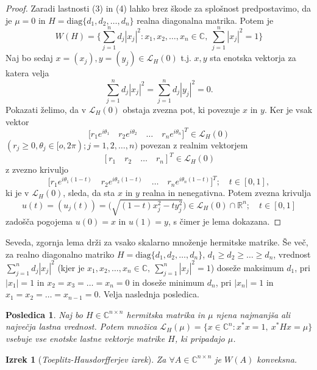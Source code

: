 \documentclass[12pt,a4paper]{amsart}
\theoremstyle{definition}
\theoremstyle{plain}
\newtheorem{izrek}[definicija]{Izrek}
\newtheorem{posledica}[definicija]{Posledica}
\newcommand{\LH}{\mathcal{L}}
\newcommand{\R}{\mathbb R}
\newcommand{\C}{\mathbb C}
\begin{document}
\begin{proof}
Zaradi lastnosti (3) in (4) lahko brez škode za splošnost predpostavimo, da je $\mu=0$ in $H=\text{diag}\{d_1,d_2,\dots,d_n\}$ realna diagonalna matrika.
Potem je 
$$W(H)=\Big\{ \sum_{j=1}^{n} d_j|x_j|^2\! : x_1,x_2,\dots,x_n \in \C,\ \sum_{j=1}^{n} |x_j|^2=1\Big \}$$
Naj bo sedaj $x=(x_j), y=(y_j)\in \LH_{H}(0)$ t.j. $x,y$ sta enotska vektorja za katera velja 
$$\sum_{j=1}^{n} d_j|x_j|^2=\sum_{j=1}^{n} d_j|y_j|^2=0.$$
 Pokazati želimo, da v $\LH_{H}(0)$ obstaja zvezna pot, ki povezuje $x$ in $y$. Ker je vsak vektor 
$$\Big[r_1 e^{i\theta_1}\quad  r_2 e^{i\theta_2}\quad  \dots\quad r_n e^{i\theta_n}\Big]^T \in \LH_{H}(0)$$  
$(r_j \geq 0, \theta_j\in [o, 2\pi); j=1,2,\dots,n)$ povezan z realnim vektorjem 
$$[r_1 \quad r_2 \quad \dots \quad r_n]^T \in \LH_{H}(0)$$
 z zvezno krivuljo
$$\Big[r_1 e^{i\theta_1(1-t)}\quad  r_2 e^{i\theta_2(1-t)}\quad  \dots\quad  r_n e^{i\theta_n(1-t)}\Big]^T; \quad t\in[0,1],$$
ki je v $\LH_{H}(0)$, sleda, da sta $x$ in $y$ realna in nenegativna. Potem zvezna krivulja
$$u(t)=(u_j(t))=\Big(\sqrt{(1-t)x^2_j -ty^2_j}\Big) \in \LH_{H}(0)\cap \R^n ; \quad t\in [0,1]$$
zadošča pogojema $u (0)=x$ in $u (1) =y$, s čimer je lema dokazana.
\end{proof}

Seveda, zgornja lema drži za vsako skalarno množenje hermitske matrike. 
Še več, za realno diagonalno matriko $H=\text{diag}\{d_1,d_2,\dots,d_n\}$, $d_1\geq d_2\geq \dots \geq d_n$, vrednost $\sum_{j=1}^{n} d_j|x_j|^2$ 
(kjer je $x_1,x_2,\dots, x_n \in \C,\ \sum_{j=1}^{n}|x_j|^2 =1$) doseže maksimum $d_1$, pri $|x_1|=1$ in $x_2=x_3=\dots=x_n=0$ in doseže minimum $d_n$, pri $|x_n|=1$ in $x_1=x_2=\dots=x_{n-1}=0$. Velja naslednja posledica.

\begin{posledica}
Naj bo $H\in \C^{n\times n}$ hermitska matrika in $\mu$ njena najmanjša ali največja lastna vrednost. Potem množica $\LH_{H}(\mu)=\{x\in \C^n\! : x^\ast x=1,\ x^\ast Hx=\mu \}$ vsebuje vse enotske lastne vektorje matrike $H$, ki pripadajo $\mu$.
\end{posledica}

\begin{izrek}[\emph{Toeplitz-Hausdorfferjev izrek}]
Za $\forall A\in \C^{n\times n}$ je $W(A)$ konveksna.
\end{izrek}
\end{document}
